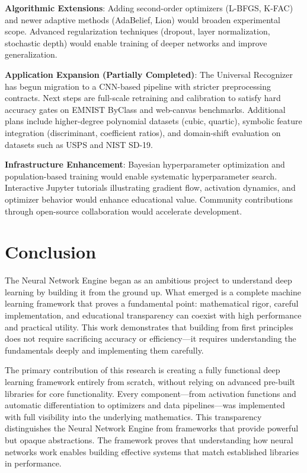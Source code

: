 \documentclass[11pt,a4paper]{report}
\begin{document}
\textbf{Algorithmic Extensions}: Adding second-order optimizers (L-BFGS, K-FAC) and newer adaptive methods (AdaBelief, Lion) would broaden experimental scope. Advanced regularization techniques (dropout, layer normalization, stochastic depth) would enable training of deeper networks and improve generalization.

\textbf{Application Expansion (Partially Completed)}: The Universal Recognizer has begun migration to a CNN-based pipeline with stricter preprocessing contracts. Next steps are full-scale retraining and calibration to satisfy hard accuracy gates on EMNIST ByClass and web-canvas benchmarks. Additional plans include higher-degree polynomial datasets (cubic, quartic), symbolic feature integration (discriminant, coefficient ratios), and domain-shift evaluation on datasets such as USPS and NIST SD-19.

\textbf{Infrastructure Enhancement}: Bayesian hyperparameter optimization and population-based training would enable systematic hyperparameter search. Interactive Jupyter tutorials illustrating gradient flow, activation dynamics, and optimizer behavior would enhance educational value. Community contributions through open-source collaboration would accelerate development.

\chapter{Conclusion}

The Neural Network Engine began as an ambitious project to understand deep learning by building it from the ground up. What emerged is a complete machine learning framework that proves a fundamental point: mathematical rigor, careful implementation, and educational transparency can coexist with high performance and practical utility. This work demonstrates that building from first principles does not require sacrificing accuracy or efficiency—it requires understanding the fundamentals deeply and implementing them carefully.

The primary contribution of this research is creating a fully functional deep learning framework entirely from scratch, without relying on advanced pre-built libraries for core functionality. Every component—from activation functions and automatic differentiation to optimizers and data pipelines—was implemented with full visibility into the underlying mathematics. This transparency distinguishes the Neural Network Engine from frameworks that provide powerful but opaque abstractions. The framework proves that understanding how neural networks work enables building effective systems that match established libraries in performance.
\end{document}
